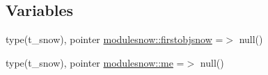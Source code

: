 \subsection*{Variables}
\begin{DoxyCompactItemize}
\item 
type(t\+\_\+snow), pointer \mbox{\hyperlink{namespacemodulesnow_a2d3dd12f242203d21e700da3e66dc4e0}{modulesnow\+::firstobjsnow}} =$>$ null()
\item 
type(t\+\_\+snow), pointer \mbox{\hyperlink{namespacemodulesnow_aefbccc67c85115a076712d1c6bca86f5}{modulesnow\+::me}} =$>$ null()
\end{DoxyCompactItemize}
